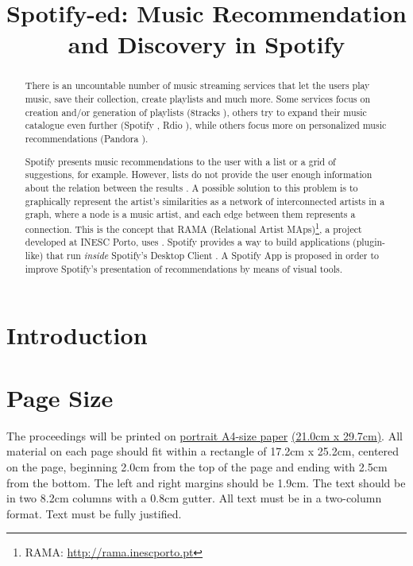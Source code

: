 \documentclass{article}
\title{Spotify-ed: Music Recommendation and Discovery in Spotify}
\begin{document}
%
\maketitle
%
\begin{abstract}
  There is an uncountable number of music streaming services that let the users play music, save their collection, create playlists and much more.
  Some services focus on creation and/or generation of playlists (8tracks \cite{8tracks}), others try to expand their music catalogue even further (Spotify \cite{spotify}, Rdio \cite{rdio}), while others focus more on personalized music recommendations (Pandora \cite{pandora}).

  Spotify presents music recommendations to the user with a list or a grid of suggestions, for example.
  However, lists do not provide the user enough information about the relation between the results \cite{Lamere2008}.
  A possible solution to this problem is to graphically represent the artist's similarities as a network of interconnected artists in a graph, where a node is a music artist, and each edge between them represents a connection.
  This is the concept that RAMA (Relational Artist MAps)\footnote{RAMA: \url{http://rama.inescporto.pt}}, a project developed at INESC Porto, uses \cite{Costa2008} \cite{Sarmento2009} \cite{Costa2009} \cite{Gouyon2011}.
  Spotify provides a way to build applications (plugin-like) that run \emph{inside} Spotify's Desktop Client \cite{spotifyapps}.
  A Spotify App is proposed in order to improve Spotify's presentation of recommendations by means of visual tools.

\end{abstract}
%
\section{Introduction}\label{sec:introduction}


\section{Page Size}\label{sec:page_size}

The proceedings will be printed on \underline{portrait A4-size paper} \underline{(21.0cm x 29.7cm)}.
All material on each page should fit within a rectangle of 17.2cm x 25.2cm,
centered on the page, beginning 2.0cm
from the top of the page and ending with 2.5cm from the bottom.
The left and right margins should be 1.9cm.
The text should be in two 8.2cm columns with a 0.8cm gutter.
All text must be in a two-column format.
Text must be fully justified.
\end{document}

